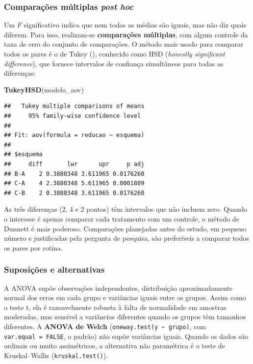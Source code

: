 \documentclass[
]{book}
\newenvironment{Shaded}{\begin{snugshade}}{\end{snugshade}}
\newcommand{\FunctionTok}[1]{\textcolor[rgb]{0.13,0.29,0.53}{\textbf{#1}}}
\newcommand{\NormalTok}[1]{#1}
\begin{document}
\subsubsection{\texorpdfstring{Comparações múltiplas \emph{post hoc}}{Comparações múltiplas post hoc}}\label{comparauxe7uxf5es-muxfaltiplas-post-hoc}

Um \(F\) significativo indica que nem todas as médias são iguais, mas não diz quais diferem. Para isso, realizam-se \textbf{comparações múltiplas}, com algum controle da taxa de erro do conjunto de comparações. O método mais usado para comparar todos os pares é o de Tukey (), conhecido como HSD (\emph{honestly significant difference}), que fornece intervalos de confiança simultâneos para todas as diferenças:

\begin{Shaded}
\begin{Highlighting}[]
\FunctionTok{TukeyHSD}\NormalTok{(modelo\_aov)}
\end{Highlighting}
\end{Shaded}

\begin{verbatim}
##   Tukey multiple comparisons of means
##     95% family-wise confidence level
## 
## Fit: aov(formula = reducao ~ esquema)
## 
## $esquema
##     diff       lwr      upr     p adj
## B-A    2 0.3880348 3.611965 0.0176260
## C-A    4 2.3880348 5.611965 0.0001809
## C-B    2 0.3880348 3.611965 0.0176260
\end{verbatim}

As três diferenças (2, 4 e 2 pontos) têm intervalos que não incluem zero. Quando o interesse é apenas comparar cada tratamento com um controle, o método de Dunnett é mais poderoso. Comparações planejadas antes do estudo, em pequeno número e justificadas pela pergunta de pesquisa, são preferíveis a comparar todos os pares por rotina.

\subsubsection{Suposições e alternativas}\label{suposiuxe7uxf5es-e-alternativas}

A ANOVA supõe observações independentes, distribuição aproximadamente normal dos erros em cada grupo e variâncias iguais entre os grupos. Assim como o teste t, ela é razoavelmente robusta à falta de normalidade em amostras moderadas, mas sensível a variâncias diferentes quando os grupos têm tamanhos diferentes. A \textbf{ANOVA de Welch} (\texttt{oneway.test(y\ \textasciitilde{}\ grupo)}, com \texttt{var.equal\ =\ FALSE}, o padrão) não supõe variâncias iguais. Quando os dados são ordinais ou muito assimétricos, a alternativa não paramétrica é o teste de Kruskal--Wallis (\texttt{kruskal.test()}).
\end{document}
